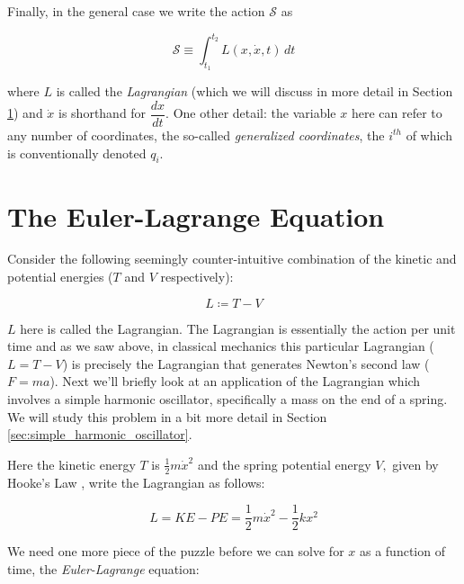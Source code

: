 \documentclass{article}
\theoremstyle{definition}
\begin{document}
\bigskip
\noindent
Finally, in the general case we write the action $\mathcal{S}$ as 

\bigskip
\begin{equation*}
\mathcal{S} \equiv \int_{t_1}^{t_2} L(x,\dot{x},t) \, dt
\end{equation*}

\bigskip
{
\noindent
where $L$ is called the \emph{Lagrangian} (which we will discuss
in more detail in Section \ref{sec:euler_lagrange}) and $\dot{x}$
is shorthand for $\dfrac{dx}{dt}$. One other detail: the variable
$x$ here can refer to any number of coordinates, the so-called
\emph{generalized coordinates}, the $i^{th}$ of which is
conventionally denoted  $q_i$. \par } 


\section{The Euler-Lagrange Equation}
\label{sec:euler_lagrange}
Consider the following seemingly counter-intuitive combination of
the kinetic and potential energies ($T$ and $V$ respectively): 

\begin{equation}
L \coloneqq T  - V
\label{eqn:lagrangian}
\end{equation}


{ 
\noindent
$L$ here is called the Lagrangian.  The Lagrangian is essentially the
action per unit time and as we saw above,  in classical mechanics
this particular Lagrangian ($L = T - V$) is precisely the
Lagrangian that generates Newton’s second law ($F = ma$). Next
we'll briefly look at an application of the Lagrangian which
involves a simple harmonic oscillator, specifically a mass on the
end of a spring. We will study this problem in a bit more detail
in Section \ref{sec:simple_harmonic_oscillator}. \par}

\bigskip
\noindent
Here the kinetic energy $T$ is $\frac{1}{2} m \dot{x}^2$ and the
spring potential energy $V,$ given by Hooke's Law
\cite{wiki:hookes_law}, write the Lagrangian as follows: 

\bigskip
\begin{equation*}
L = KE - PE = \dfrac{1}{2} m \dot{x}^2 - \dfrac{1}{2} k x^2
\end{equation*}

\bigskip
\noindent
We need one more piece of the puzzle before we can solve for $x$
as a function of time, the  \emph{Euler-Lagrange} equation: 
\end{document}

